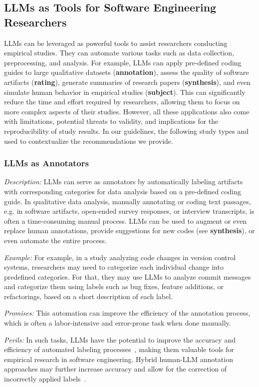 \documentclass[11pt]{article}
\begin{document}
\subsection{LLMs as Tools for Software Engineering Researchers}

LLMs can be leveraged as powerful tools to assist researchers conducting empirical studies.
They can automate various tasks such as data collection, preprocessing, and analysis.
For example, LLMs can apply pre-defined coding guides to large qualitative datasets (\textbf{annotation}), assess the quality of software artifacts (\textbf{rating}), generate summaries of research papers (\textbf{synthesis}), and even simulate human behavior in empirical studies (\textbf{subject}).
This can significantly reduce the time and effort required by researchers, allowing them to focus on more complex aspects of their studies.
However, all these applications also come with limitations, potential threats to validity, and implications for the reproducibility of study results.
In our guidelines, the following study types and used to contextualize the recommendations we provide.


\subsubsection{LLMs as Annotators}

\emph{Description:} LLMs can serve as annotators by automatically labeling artifacts with corresponding categories for data analysis based on a pre-defined coding guide.
In qualitative data analysis, manually annotating or coding text passages, e.g. in software artifacts, open-ended survey responses, or interview transcripts, is often a time-consuming manual process.
LLMs can be used to augment or even replace human annotations, provide suggestions for new codes (see \textbf{synthesis}), or even automate the entire process.

\emph{Example:} For example, in a study analyzing code changes in version control systems, researchers may need to categorize each individual change into predefined categories.
For that, they may use LLMs to analyze commit messages and categorize them using labels such as bug fixes, feature additions, or refactorings, based on a short description of each label.

\emph{Promises:} This automation can improve the efficiency of the annotation process, which is often a labor-intensive and error-prone task when done manually.

\emph{Perils:} In such tasks, LLMs have the potential to improve the accuracy and efficiency of automated labeling processes~\cite{DBLP:conf/kdd/WanSJKCNSSWYABJ24}, making them valuable tools for empirical research in software engineering.
Hybrid human-LLM annotation approaches may further increase accuracy and allow for the correction of incorrectly applied labels~\cite{DBLP:conf/chi/Wang0RMM24}.
\end{document}
